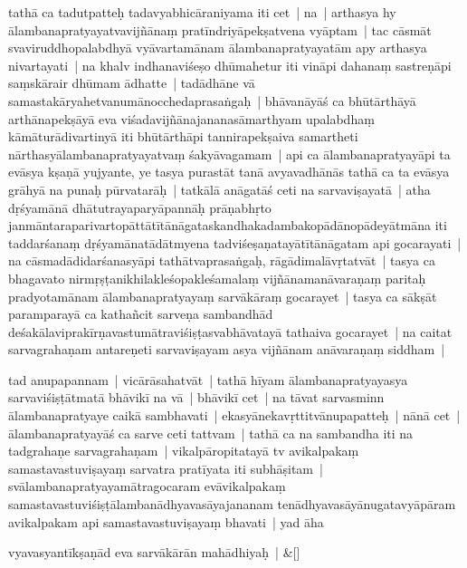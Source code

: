 \documentclass[article,12pt,a4paper]{memoir}%
\newcounter{parCount}
\begin{document}
	  
	  \pstart \leavevmode%
	\label{thakur75-11.27}tathā ca tadutpatteḥ tadavyabhicāraniyama iti cet | na | arthasya hy ālambanapratyayatvavijñānaṃ pratīndriyāpekṣatvena vyāptam | tac cāsmāt svaviruddhopalabdhyā vyāvartamānam ālambanapratyayatām apy arthasya nivartayati | na khalv indhanaviśeṣo dhūmahetur iti vināpi dahanaṃ sastreṇāpi saṃskārair dhūmam ādhatte | tadādhāne vā samastakāryahetvanumānocchedaprasaṅgaḥ | bhāvanāyāś ca bhūtārthāyā arthānapekṣāyā eva viśadavijñānajananasāmarthyam upalabdhaṃ kāmāturādivartinyā iti bhūtārthāpi tannirapekṣaiva samartheti nārthasyālambanapratyayatvaṃ śakyāvagamam | api ca ālambanapratyayāpi ta evāsya kṣaṇā yujyante, ye tasya purastāt tanā avyavadhānās tathā ca ta evāsya grāhyā na punaḥ pūrvatarāḥ | tatkālā anāgatāś ceti na sarvaviṣayatā | atha dṛśyamānā dhātutrayaparyāpannāḥ prāṇabhṛto janmāntaraparivartopāttātītānāgataskandhakadambakopādānopādeyātmāna iti taddarśanaṃ dṛśyamānatādātmyena tadviśeṣaṇatayātītānāgatam api gocarayati | na cāsmadādidarśanasyāpi tathātvaprasaṅgaḥ, rāgādimalāvṛtatvāt | tasya ca bhagavato nirmṛṣṭanikhilakleśopakleśamalaṃ vijñānamanāvaraṇaṃ paritaḥ pradyotamānam ālambanapratyayaṃ sarvākāraṃ gocarayet | tasya ca sākṣāt paramparayā ca kathañcit sarveṇa sambandhād deśakālaviprakīrṇavastumātraviśiṣṭasvabhāvatayā tathaiva gocarayet | na caitat sarvagrahaṇam antareṇeti sarvaviṣayam asya vijñānam anāvaraṇaṃ siddham | 
	{}
	\pend%
      

	  
	  \pstart \leavevmode%
	\label{thakur75-12.16}tad anupapannam | vicārāsahatvāt | tathā hīyam ālambanapratyayasya sarvaviśiṣṭātmatā bhāvikī na vā | bhāvikī cet | na tāvat sarvasminn ālambanapratyaye caikā sambhavati | ekasyānekavṛttitvānupapatteḥ | nānā cet | ālambanapratyayāś ca sarve ceti tattvam | tathā ca na sambandha iti na tadgrahaṇe sarvagrahaṇam | vikalpāropitatayā tv avikalpakaṃ samastavastuviṣayaṃ sarvatra pratīyata iti subhāṣitam | svālambanapratyayamātragocaram evāvikalpakaṃ samastavastuviśiṣṭālambanādhyavasāyajananam tenādhyavasāyānugatavyāpāram avikalpakam api samastavastuviṣayaṃ bhavati | yad āha 
	{}
	\pend%
      
	    
	    \stanza[\smallbreak]
	  vyavasyantīkṣaṇād eva sarvākārān mahādhiyaḥ | \&[\smallbreak]
	  
\end{document}
